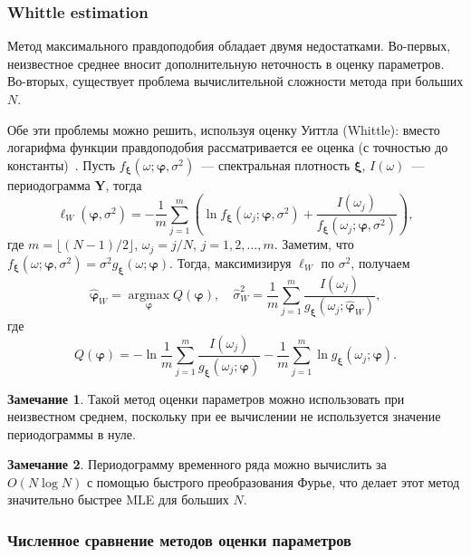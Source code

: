 \documentclass[specialist,
substylefile = spbu_report.rtx,
subf,12pt]{disser}
\theoremstyle{definition}
\newtheorem{remark}{Замечание}[chapter]
\begin{document}
\subsubsection{Whittle estimation}\label{sect:whittle}

Метод максимального правдоподобия обладает двумя недостатками. Во-первых, неизвестное среднее вносит дополнительную неточность в оценку параметров. Во-вторых, существует проблема вычислительной сложности метода при больших $N$.

Обе эти проблемы можно решить, используя оценку Уиттла (Whittle): вместо логарифма функции правдоподобия рассматривается ее оценка (с точностью до константы)~\cite{Whittle1953}. Пусть $f_{\bm\xi}(\omega; \bm\varphi, \sigma^2)$~--- спектральная плотность $\bm\xi$, $I(\omega)$~--- периодограмма $\bm Y$, тогда
\begin{equation}\label{eq:whittle_loglik}
	\ell_W(\bm\varphi, \sigma^2)=-\frac1m\sum_{j=1}^m\left(\ln f_{\bm\xi}(\omega_j; \bm\varphi, \sigma^2) + \frac{I(\omega_j)}{f_{\bm\xi}(\omega_j; \bm\varphi, \sigma^2)}\right),
\end{equation}
где $m=\lfloor(N-1)/2\rfloor$, $\omega_j = j / N$, $j=1,2,\ldots,m$. Заметим, что $f_{\bm\xi}(\omega; \bm\varphi, \sigma^2)=\sigma^2 g_{\bm\xi}(\omega; \bm\varphi)$. Тогда, максимизируя $\ell_W$ по $\sigma^2$, получаем
\[
	\widehat{\bm\varphi}_W = \operatorname*{argmax}_{\bm\varphi}Q(\bm\varphi),\quad \widehat\sigma_W^2=\frac1m \sum_{j=1}^m\frac{I(\omega_j)}{g_{\bm\xi}(\omega_j; \widehat{\bm\varphi}_W)},
\]
где
\[
	Q(\bm\varphi)=-\ln\frac1m \sum_{j=1}^m\frac{I(\omega_j)}{g_{\bm\xi}(\omega_j; \bm\varphi)} - \frac1m \sum_{j=1}^m\ln g_{\bm\xi}(\omega_j; \bm\varphi).
\]
\begin{remark}
	Такой метод оценки параметров можно использовать при неизвестном среднем, поскольку при ее вычислении не используется значение периодограммы в нуле.
\end{remark}
\begin{remark}
	Периодограмму временного ряда можно вычислить за $O(N\log N)$ с помощью быстрого преобразования Фурье, что делает этот метод значительно быстрее MLE для больших $N$.
\end{remark}

\subsubsection{Численное сравнение методов оценки параметров}\label{sect:est_param}
\end{document}
